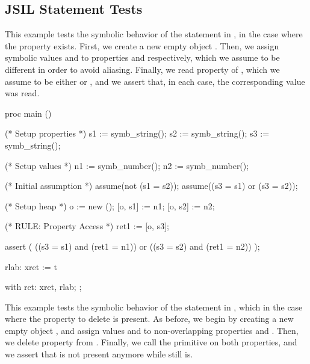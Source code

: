 \subsection{JSIL Statement Tests}

This example tests the symbolic behavior of the \jsil statement \mbox{} in \cosette, in the case where the property exists.
First, we create a new empty object .
Then, we assign symbolic values  and  to properties  and  respectively, which we assume to be different in order to avoid aliasing.
Finally, we read property  of , which we assume to be either  or , and we assert that, in each case, the corresponding value was read.

\begin{lstjshere}
proc main () {
    (* Setup properties *)
    s1 := symb_string();
    s2 := symb_string();
    s3 := symb_string();

    (* Setup values *)
    n1 := symb_number();
    n2 := symb_number();

    (* Initial assumption *)
    assume(not (s1 = s2));
    assume((s3 = s1) or (s3 = s2));

    (* Setup heap *)
    o := new ();
    [o, s1] := n1;
    [o, s2] := n2;

    (* RULE: Property Access *)
    ret1 := [o, s3];

    assert (
        ((s3 = s1) and (ret1 = n1)) or 
        ((s3 = s2) and (ret1 = n2))
    );

    rlab:    xret := $$t
}
with
{
    ret:    xret, rlab;
};
\end{lstjshere}


This example tests the symbolic behavior of the \jsil statement  in \cosette, which in the case where the property to delete is present.
As before, we begin by creating a new empty object , and assign values  and  to non-overlapping properties  and .
Then, we delete property  from .
Finally, we call the  primitive on both properties, and we assert that  is not present anymore while  still is.

